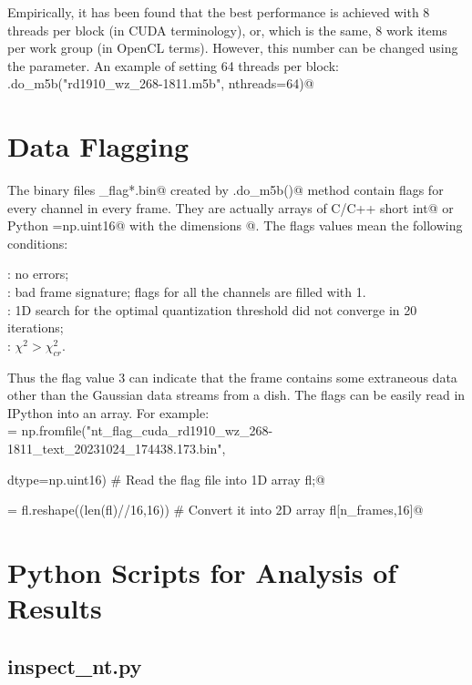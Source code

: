 \documentclass[letterpaper,twoside,12pt]{article}
\begin{document}
Empirically, it has been found that the best performance is achieved 
with 8 threads per block (in CUDA terminology), or, which is the same, 
8 work items per work group (in OpenCL terms). However, this number can 
be changed using the \verb@nthreads@ parameter. An example of setting 64 threads per block: \\

\noindent \verb@nt.do_m5b("rd1910_wz_268-1811.m5b", nthreads=64)@ 


\section{Data Flagging}

The binary files \verb@nt_flag*.bin@ created by \verb@Normtest.do_m5b()@ method contain flags for every channel in every frame. They are actually arrays of C/C++ \verb@unsigned short int@ or Python \verb@dtype=np.uint16@ with the dimensions \verb@[n_frames,16]@. The flags values mean the following conditions:
 
: no errors; \\
: bad frame signature; flags for all the channels are filled with 1.  \\
: 1D search for the optimal quantization threshold did not converge in 20 iterations; \\
: $\chi^2 > \chi^2_{cr}$.

Thus the flag value 3 can indicate that the frame contains some extraneous data other than the Gaussian data streams from a dish. The flags can be easily read in IPython into an array. For example: \\

\noindent \verb@fl = np.fromfile("nt_flag_cuda_rd1910_wz_268-1811_text_20231024_174438.173.bin", \@ \par
\noindent \verb@                 dtype=np.uint16)  # Read the flag file into 1D array fl;@ \par
\noindent \verb@fl = fl.reshape((len(fl)//16,16)) # Convert it into 2D array fl[n_frames,16]@  \par



\section{Python Scripts for Analysis of Results}

\subsection{inspect\_nt.py}
\end{document}
